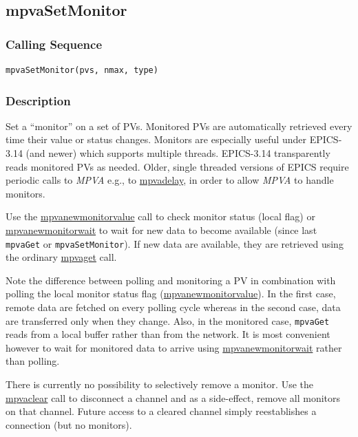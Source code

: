 \documentclass{article}
\newcommand{\sca}{\ita{MPVA}}
\newcommand{\com}[1]{{\tt #1}}
\newcommand{\pbrk}{\pagebreak[3]}
\newcommand{\comref}[2]{\hyperref{\com{#1}}{\com{#1} (see }{)}{#2}}
\newcommand{\ita}[1]{\emph{#1}}
\renewcommand{\pbrk}{}
\begin{document}
\pbrk
\subsection{mpvaSetMonitor}
\label{mpvasetmonitor}
\subsubsection{Calling Sequence}
\begin{verbatim}
mpvaSetMonitor(pvs, nmax, type)
\end{verbatim}
\subsubsection{Description}
Set a ``monitor'' on a set of PVs. Monitored PVs are automatically retrieved
every time their value or status changes. 
Monitors are especially useful under EPICS-3.14 (and newer) which supports
multiple threads. EPICS-3.14 transparently reads monitored PVs as needed.
Older, single threaded versions of EPICS require periodic calls to \sca{}
e.g., to \comref{mpvaDelay}{mpvadelay}, in order to allow \sca{} to handle
monitors.

Use the \comref{mpvaNewMonitorValue}{mpvanewmonitorvalue} call to check
monitor status (local flag) or \comref{mpvaNewMonitorWait}{mpvanewmonitorwait}
to wait for new data to become available (since last \com{mpvaGet} or \com{mpvaSetMonitor}).
If new data are available, they are retrieved using
the ordinary \comref{mpvaGet}{mpvaget} call.

Note the difference between polling and monitoring a PV in combination with
polling the local monitor status flag (\comref{mpvaNewMonitorValue}{mpvanewmonitorvalue}).
In the first case, remote data are fetched
on every polling cycle whereas in the second case, data are transferred only
when they change.  Also, in the monitored case, \com{mpvaGet} reads from a local
buffer rather than from the network. It is most convenient however to wait
for monitored data to arrive using \comref{mpvaNewMonitorWait}{mpvanewmonitorwait}
rather than polling.

There is currently no possibility to selectively remove a monitor. Use
the \comref{mpvaClear}{mpvaclear} call to disconnect a channel and as a side-effect,
remove all monitors on that channel. Future access to a cleared channel
simply reestablishes a connection (but no monitors).
\end{document}
